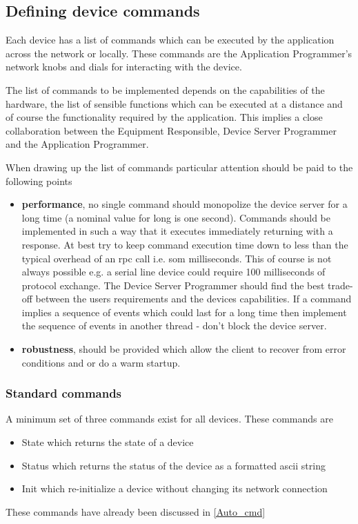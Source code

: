 \subsection{Defining device commands}

Each device has a list of commands which can be executed by the application
across the network or locally. These commands are the Application
Programmer's network knobs and dials for interacting with the device.

The list of commands to be implemented depends on the capabilities
of the hardware, the list of sensible functions which can be executed
at a distance and of course the functionality required by the application.
This implies a close collaboration between the Equipment Responsible,
Device Server Programmer and the Application Programmer.

When drawing up the list of commands particular attention should be
paid to the following points 
\begin{itemize}
\item \textbf{performance}, no single command should monopolize the device
server for a long time (a nominal value for long is one second). Commands
should be implemented in such a way that it executes immediately returning
with a response. At best try to keep command execution time down to
less than the typical overhead of an rpc call i.e. som milliseconds.
This of course is not always possible e.g. a serial line device could
require 100 milliseconds of protocol exchange. The Device Server Programmer
should find the best trade-off between the users requirements and
the devices capabilities. If a command implies a sequence of events
which could last for a long time then implement the sequence of events
in another thread - don't block the device server.
\item \textbf{robustness}, should be provided which allow the client to
recover from error conditions and or do a warm startup.
\end{itemize}

\subsubsection{Standard commands}

A minimum set of three commands exist for all devices. These commands
are 
\begin{itemize}
\item State which returns the state of a device
\item Status which returns the status of the device as a
formatted ascii string
\item Init which re-initialize a device without changing its
network connection
\end{itemize}
These commands have already been discussed in \ref{Auto_cmd}


